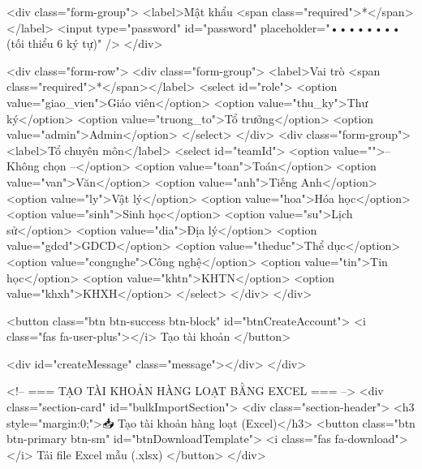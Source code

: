                 <div class="form-group">
                    <label>Mật khẩu <span class="required">*</span></label>
                    <input type="password" id="password" placeholder="•••••••• (tối thiểu 6 ký tự)" />
                </div>

                <div class="form-row">
                    <div class="form-group">
                        <label>Vai trò <span class="required">*</span></label>
                        <select id="role">
                            <option value="giao_vien">Giáo viên</option>
                            <option value="thu_ky">Thư ký</option>
                            <option value="truong_to">Tổ trưởng</option>
                            <option value="admin">Admin</option>
                        </select>
                    </div>
                    <div class="form-group">
                        <label>Tổ chuyên môn</label>
                        <select id="teamId">
                            <option value="">-- Không chọn --</option>
                            <option value="toan">Toán</option>
                            <option value="van">Văn</option>
                            <option value="anh">Tiếng Anh</option>
                            <option value="ly">Vật lý</option>
                            <option value="hoa">Hóa học</option>
                            <option value="sinh">Sinh học</option>
                            <option value="su">Lịch sử</option>
                            <option value="dia">Địa lý</option>
                            <option value="gdcd">GDCD</option>
                            <option value="theduc">Thể dục</option>
                            <option value="congnghe">Công nghệ</option>
                            <option value="tin">Tin học</option>
                            <option value="khtn">KHTN</option>
                            <option value="khxh">KHXH</option>
                        </select>
                    </div>
                </div>

                <button class="btn btn-success btn-block" id="btnCreateAccount">
                    <i class="fas fa-user-plus"></i> Tạo tài khoản
                </button>

                <div id="createMessage" class="message"></div>
            </div>

            <!-- === TẠO TÀI KHOẢN HÀNG LOẠT BẰNG EXCEL === -->
            <div class="section-card" id="bulkImportSection">
                <div class="section-header">
                    <h3 style="margin:0;">📥 Tạo tài khoản hàng loạt (Excel)</h3>
                    <button class="btn btn-primary btn-sm" id="btnDownloadTemplate">
                        <i class="fas fa-download"></i> Tải file Excel mẫu (.xlsx)
                    </button>
                </div>

